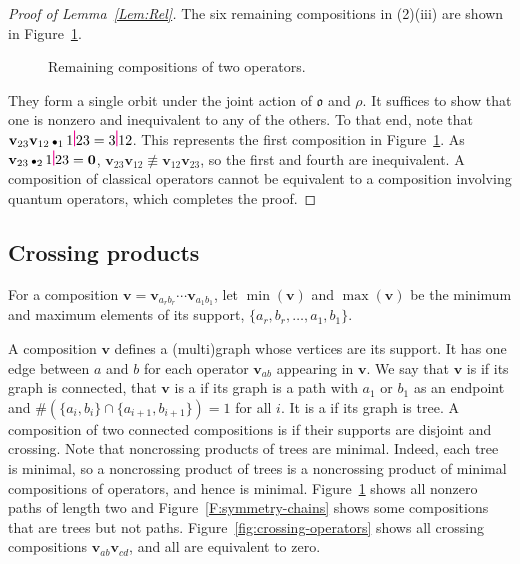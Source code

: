 \documentclass[12pt,oneside,reqno]{amsart}
\theoremstyle{definition}
\numberwithin{equation}{section}
\newcommand{\qv}{{\mathbf v}}
\newcommand{\bzero}{{\mathbf 0}}
\newcommand{\ptsp}{\hspace{0.55pt}}
\newcommand{\pb}{\raisebox{-1pt}{\ptsp\color{magenta}\rule{0.75pt}{11pt}}\ptsp}  %
\DeclareMathOperator{\kactionop}{{\scriptstyle \bullet}}
\newcommand{\defcolor}[1]{{\color{RoyalBlue}#1}}
\newcommand{\demph}[1]{\defcolor{{\sl #1}}}
\newcommand{\ncycle}{\mathfrak o}
\begin{document}
\begin{proof}[Proof of Lemma~\ref{Lem:Rel}]
 The six remaining compositions in (2)(iii) are shown in Figure~\ref{fig:nonzero-touching-operators}.
 \begin{figure}[htb]
 \centering
     \quad
     \quad
     \quad
     \quad
     \quad
  \caption{Remaining compositions of two operators.}
  \label{fig:nonzero-touching-operators}
 \end{figure}
 They form a single orbit under the joint action of $\ncycle$ and $\rho$.
 It suffices to show that one is nonzero and inequivalent to any of the others.
 To that end, note that  $ \qv_{23} \qv_{12}\kactionop_1 1\pb23 = 3\pb12$.
 This represents the first composition in Figure~\ref{fig:nonzero-touching-operators}.
 As $\qv_{23}\kactionop_2 1\pb23 = \bzero$, $\qv_{23} \qv_{12}\not\equiv \qv_{12}\qv_{23}$, so the first and fourth are inequivalent.
 A composition of classical operators cannot be equivalent to a composition involving quantum operators, which completes the proof.
\end{proof}


\subsection{Crossing products}
\label{crossing-products}
For a composition $\qv=\qv_{a_rb_r}\cdots \qv_{a_1b_1}$, let  $\min(\qv)$ and $\max(\qv)$ be the minimum and maximum elements
of its support, $\{a_r,b_r,\dots, a_1,b_1\}$.


A composition $\qv$ defines a \defcolor{(multi)graph} whose vertices are its support.
It has one edge between $a$ and $b$ for each operator $\qv_{ab}$ appearing in $\qv$.
We say that $\qv$ is \demph{connected} if its graph is connected, that $\qv$ is a \demph{path} if its graph is a path with $a_1$ or $b_1$ as
an endpoint and $\#(\{a_i,b_i\}\cap\{a_{i+1},b_{i+1}\})=1$ for all $i$.
It is a \demph{tree} if its graph is tree.
A composition of two connected compositions is \demph{crossing} if their supports are disjoint and crossing.
Note that noncrossing products of trees are minimal.  Indeed, each tree is minimal, so a noncrossing product of trees is a noncrossing product of minimal compositions of operators, and hence is minimal.
Figure~\ref{fig:nonzero-touching-operators} shows all nonzero paths of length two and Figure~\ref{F:symmetry-chains} shows some
compositions that are trees but not paths.  
Figure~\ref{fig:crossing-operators} shows all crossing compositions $\qv_{ab} \qv_{cd}$,
and all are equivalent to zero.
\end{document}

